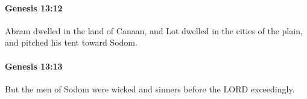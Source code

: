 		\paragraph{Genesis 13:12} %
			\label{GENESIS-13-12}

			Abram dwelled in the land of Canaan, and Lot dwelled in the cities of the plain, and pitched his tent toward Sodom.


		\paragraph{Genesis 13:13} %
			\label{GENESIS-13-13}

			But the men of Sodom were wicked and sinners before the LORD exceedingly.


